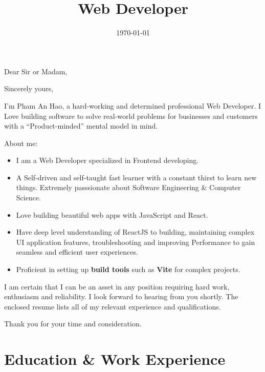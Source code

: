 \documentclass[11pt,a4paper,sans]{moderncv}        %
\title{Web Developer}
\begin{document}
\clearpage

\date{\today}
\opening{Dear Sir or Madam,}
\closing{Sincerely yours,}
\makelettertitle

I'm Pham An Hao, a hard-working and determined professional Web Developer. I Love building software to solve real-world problems for businesses and customers with a ``Product-minded'' mental model in mind.

About me:


\begin{itemize}
  \item I am a Web Developer specialized in Frontend developing.
  \item A Self-driven and self-taught fast learner with a constant thirst to learn new things. Extremely passsionate about Software Engineering \& Computer Science.
  \item Love building beautiful web apps with JavaScript and React.
  \item Have deep level understanding of ReactJS to building, maintaining complex UI application features, troubleshooting and improving Performance to gain seamless and efficient user experiences.
  \item Proficient in setting up \textbf{build tools} such as \textbf{Vite} for complex projects.
\end{itemize}

I am certain that I can be an asset in any position requiring hard work, enthusiasm and reliability. I look forward to hearing from you shortly. The enclosed resume lists all of my relevant experience and qualifications.

Thank you for your time and consideration.

\makeletterclosing

\newpage


\makecvtitle

\section{Education \& Work Experience}
\end{document}
